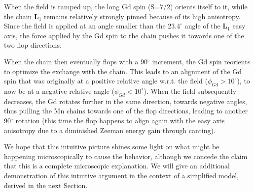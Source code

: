 When the field is ramped up, the long Gd spin (S=7/2) orients itself to it, while the chain $\bm L_1$ remains relatively strongly pinned because of its high anisotropy.
Since the field is applied at an angle smaller than the $23.4^\circ$ angle of the $\bm L_1$ easy axis, the force applied by the Gd spin to the chain pushes it towards one of the two flop directions.

When the chain then eventually flops with a 90$^\circ$ increment, the Gd spin reorients to optimize the exchange with the chain.
This leads to an alignment of the Gd spin that was originally at a positive relative angle w.r.t. the field ($\phi_{Gd}>10^\circ$), to now be at a negative relative angle ($\phi_{Gd}<10^\circ$).
When the field subsequently decreases, the Gd rotates further in the same direction, towards negative angles, thus pulling the Mn chains towards one of the flop directions, leading to another 90$^\circ$ rotation (this time the flop happens to align again with the easy axis anisotropy due to a diminished Zeeman energy gain through canting).

We hope that this intuitive picture shines some light on what might be happening microscopically to cause the behavior, although we concede the claim that this is a complete microscopic explanation. We will give an additional demonstration of this intuitive argument in the context of a simplified model, derived in the next Section.

